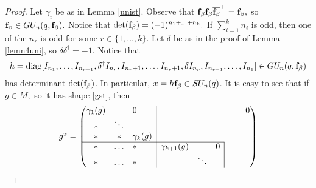 \begin{proof}
Let $\gamma_i$ be as in Lemma \ref{unist}. 
Observe that ${\bf f}_{\beta}{\bf f}_{\beta}\overline{{\bf f}_{\beta}}^{\top}={\bf f}_{\beta},$ so ${\bf f}_{\beta} \in GU_n(q,{\bf f}_{\beta}).$  Notice that $\det({\bf f}_{\beta})=(-1)^{n_1 + \ldots + n_k}.$ %
 If $\sum_{i=1}^k n_i$ is odd, then one of the $n_r$ is odd for some $r \in \{1, \ldots, k\}.$ Let $\delta$ be as in the proof of Lemma \ref{lemn4uni}, so $\delta \delta^{\dagger}=-1.$ Notice that 
\begin{equation*} \label{hdetJn}
h=\mathrm{diag}[I_{n_1}, \ldots, I_{n_{r-1}}, \delta^{\dagger}I_{n_r}, I_{n_r+1}, \ldots, I_{n_r+1}, \delta I_{n_r},  I_{n_{r-1}}, \ldots, I_{n_1} ] \in GU_n(q,{\bf f}_{\beta})
\end{equation*}
 has determinant $\det({\bf f}_{\beta})$. %
  In particular, $x=h{\bf f}_{\beta} \in SU_n(q)$.
  It is easy to see that if $g \in M,$ so it has shape \eqref{gst}, then
\begin{equation*}%
g^x=
\begin{pmatrix}
\gamma_{1}(g)& &\multicolumn{1}{l|}{0} & &  & & &    &0  \\
    *    & \ddots &\multicolumn{1}{l|}{} & & & & &    &\\
*        &* & \multicolumn{1}{l|}{\gamma_{k}(g)}& & & & &    & \\  \cline{1-6}
 *       &\ldots & \multicolumn{1}{l|}{*} &\gamma_{k+1}(g) & & \multicolumn{1}{l|}{0}  & &    &\\ 
  *      &\ldots &  \multicolumn{1}{l|}{*}& &\ddots &\multicolumn{1}{l|}{}       & &   &\\

\end{pmatrix}
\end{equation*}
\end{proof}
